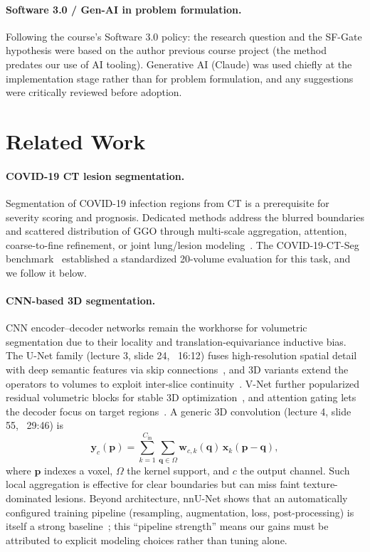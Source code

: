 \documentclass{article}
\begin{document}
\paragraph{Software 3.0 / Gen-AI in problem formulation.}
Following the course's Software 3.0 policy: the research question and the SF-Gate hypothesis were based on the author previous course project (the method predates our use of AI tooling). Generative AI (Claude) was used chiefly at the implementation stage rather than for problem formulation, and any suggestions were critically reviewed before adoption.

\section{Related Work}
\label{sec:related}

\paragraph{COVID-19 CT lesion segmentation.}
Segmentation of COVID-19 infection regions from CT is a prerequisite for severity scoring and prognosis. Dedicated methods address the blurred boundaries and scattered distribution of GGO through multi-scale aggregation, attention, coarse-to-fine refinement, or joint lung/lesion modeling~\citep{fan2020infnet}. The COVID-19-CT-Seg benchmark~\citep{ma2021benchmark,zenodo2020ctseg} established a standardized 20-volume evaluation for this task, and we follow it below.

\paragraph{CNN-based 3D segmentation.}
CNN encoder--decoder networks remain the workhorse for volumetric segmentation due to their locality and translation-equivariance inductive bias. The U-Net family {(lecture 3, slide 24, ~16:12)} fuses high-resolution spatial detail with deep semantic features via skip connections~\citep{ronneberger2015unet}, and 3D variants extend the operators to volumes to exploit inter-slice continuity~\citep{cicek2016threedunet}. V-Net further popularized residual volumetric blocks for stable 3D optimization~\citep{milletari2016vnet}, and attention gating lets the decoder focus on target regions~\citep{oktay2018attention}. A generic 3D convolution {(lecture 4, slide 55, ~29:46)} is
\begin{equation}
  \mathbf{y}_{c}(\mathbf{p}) = \sum_{k=1}^{C_{\mathrm{in}}}\sum_{\mathbf{q}\in\Omega}
  \mathbf{w}_{c,k}(\mathbf{q})\,\mathbf{x}_{k}(\mathbf{p}-\mathbf{q}),
\end{equation}
where $\mathbf{p}$ indexes a voxel, $\Omega$ the kernel support, and $c$ the output channel. Such local aggregation is effective for clear boundaries but can miss faint texture-dominated lesions. Beyond architecture, nnU-Net shows that an automatically configured training pipeline (resampling, augmentation, loss, post-processing) is itself a strong baseline~\citep{isensee2021nnunet}; this ``pipeline strength'' means our gains must be attributed to explicit modeling choices rather than tuning alone.
\end{document}
